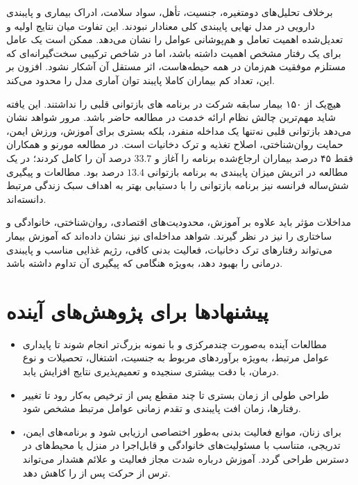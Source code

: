 برخلاف تحلیل‌های دومتغیره، جنسیت، تأهل، سواد سلامت، ادراک بیماری و پایبندی دارویی در مدل نهایی پایبندی کلی معنادار نبودند. این تفاوت میان نتایج اولیه و تعدیل‌شده اهمیت تعامل و هم‌پوشانی عوامل را نشان می‌دهد. ممکن است یک عامل برای یک رفتار مشخص اهمیت داشته باشد، اما در شاخص ترکیبی سخت‌گیرانه‌ای که مستلزم موفقیت هم‌زمان در همه حیطه‌هاست، اثر مستقل آن آشکار نشود. افزون بر این، تعداد کم بیماران کاملا پایبند توان آماری مدل را محدود می‌کند.

هیچ‌یک از ۱۵۰ بیمار سابقه شرکت در برنامه های بازتوانی قلبی را نداشتند. این یافته شاید مهم‌ترین چالش نظام ارائه خدمت در مطالعه حاضر باشد. مرور شواهد نشان می‌دهد بازتوانی قلبی نه‌تنها یک مداخله منفرد، بلکه بستری برای آموزش، ورزش ایمن، حمایت روان‌شناختی، اصلاح تغذیه و ترک دخانیات است. در مطالعه مورنو و همکاران فقط ۴۵ درصد بیماران ارجاع‌شده برنامه را آغاز و $33.7$ درصد آن را کامل کردند؛ در یک مطالعه در اتریش میزان پایبندی به برنامه بازتوانی $13.4$ درصد بود\cite{Moreno2024NonAdherence,Alhabib2026Saudi,Hammer2024Adherence}. مطالعات  و پیگیری شش‌ساله فرانسه نیز برنامه بازتوانی را با دستیابی بهتر به اهداف سبک زندگی مرتبط دانسته‌اند\cite{DibaoDina2018Adherence,Urbinati2015BLITZ4}.

مداخلات مؤثر باید علاوه بر آموزش، محدودیت‌های اقتصادی، روان‌شناختی، خانوادگی و ساختاری را نیز در نظر گیرند. شواهد مداخله‌ای نیز نشان داده‌اند که آموزش بیمار می‌تواند رفتار‌‌‌های ترک دخانیات، فعالیت بدنی کافی، رژیم غذایی مناسب و پایبندی درمانی را بهبود دهد، به‌ویژه هنگامی که پیگیری آن تداوم داشته باشد\cite{Shi2023Education,Ivers2020ISLAND}.



\section{پیشنهادها برای پژوهش‌های آینده}

\begin{itemize}
\item مطالعات آینده به‌صورت چندمرکزی و با نمونه بزرگ‌تر انجام شوند تا پایداری عوامل مرتبط، به‌ویژه برآوردهای مربوط به جنسیت، اشتغال، تحصیلات و نوع درمان، با دقت بیشتری سنجیده و تعمیم‌پذیری نتایج افزایش یابد.

\item طراحی طولی از زمان بستری تا چند مقطع پس از ترخیص به‌کار رود تا تغییر رفتارها، زمان افت پایبندی و تقدم زمانی عوامل مرتبط مشخص شود.

\item برای زنان، موانع فعالیت بدنی به‌طور اختصاصی ارزیابی شود و برنامه‌های ایمن، تدریجی، متناسب با مسئولیت‌های خانوادگی و قابل‌اجرا در منزل یا محیط‌های در دسترس طراحی گردد. آموزش درباره شدت مجاز فعالیت و علائم هشدار می‌تواند ترس از حرکت پس از  را کاهش دهد.
\end{itemize}


